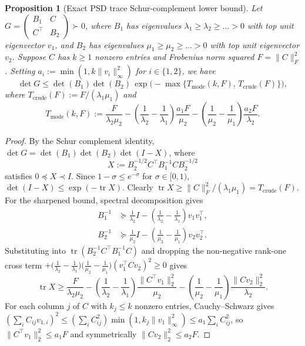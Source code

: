 \documentclass[11pt]{article}
\newtheorem{proposition}{Proposition}
\theoremstyle{remark}
\newcommand{\tr}{\operatorname{tr}}
\begin{document}
\begin{proposition}[Exact PSD trace Schur-complement lower bound]\label{prop:psd_trace}
Let $G = \begin{pmatrix} B_1 & C \\ C^\top & B_2 \end{pmatrix} \succ 0$, where $B_1$ has eigenvalues $\lambda_1 \ge \lambda_2 \ge \dots > 0$ with top unit eigenvector $v_1$, and $B_2$ has eigenvalues $\mu_1 \ge \mu_2 \ge \dots > 0$ with top unit eigenvector $v_2$. Suppose $C$ has $k \ge 1$ nonzero entries and Frobenius norm squared $F = \|C\|_F^2$. Setting $a_i := \min(1, k \|v_i\|_\infty^2)$ for $i \in \{1, 2\}$, we have
\begin{equation}\label{eq:psd_trace}
  \det G \le \det(B_1)\det(B_2)\,\exp\bigl(-\max\{T_{\mathrm{mode}}(k, F),\, T_{\mathrm{crude}}(F)\}\bigr),
\end{equation}
where $T_{\mathrm{crude}}(F) := F / (\lambda_1 \mu_1)$ and
\[
  T_{\mathrm{mode}}(k, F) := \frac{F}{\lambda_2 \mu_2}
  - \left(\frac{1}{\lambda_2} - \frac{1}{\lambda_1}\right)\frac{a_1 F}{\mu_2}
  - \left(\frac{1}{\mu_2} - \frac{1}{\mu_1}\right)\frac{a_2 F}{\lambda_2}.
\]
\end{proposition}

\begin{proof}
By the Schur complement identity, $\det G = \det(B_1)\det(B_2)\det(I - X)$, where
\[
  X := B_2^{-1/2} C^\top B_1^{-1} C B_2^{-1/2}
\]
satisfies $0 \preceq X \prec I$. Since $1 - \sigma \le e^{-\sigma}$ for $\sigma \in [0, 1)$, $\det(I - X) \le \exp(-\tr X)$. Clearly $\tr X \ge \|C\|_F^2 / (\lambda_1 \mu_1) = T_{\mathrm{crude}}(F)$. For the sharpened bound, spectral decomposition gives
\begin{align*}
  B_1^{-1} &\succeq \frac{1}{\lambda_2} I - \left(\frac{1}{\lambda_2} - \frac{1}{\lambda_1}\right) v_1 v_1^\top, \\
  B_2^{-1} &\succeq \frac{1}{\mu_2} I - \left(\frac{1}{\mu_2} - \frac{1}{\mu_1}\right) v_2 v_2^\top.
\end{align*}
Substituting into $\tr(B_2^{-1} C^\top B_1^{-1} C)$ and dropping the non-negative rank-one cross term $+\bigl(\frac{1}{\lambda_2} - \frac{1}{\lambda_1}\bigr)\bigl(\frac{1}{\mu_2} - \frac{1}{\mu_1}\bigr)(v_1^\top C v_2)^2 \ge 0$ gives
\[
  \tr X \ge \frac{F}{\lambda_2 \mu_2}
  - \left(\frac{1}{\lambda_2} - \frac{1}{\lambda_1}\right)\frac{\|C^\top v_1\|_2^2}{\mu_2}
  - \left(\frac{1}{\mu_2} - \frac{1}{\mu_1}\right)\frac{\|C v_2\|_2^2}{\lambda_2}.
\]
For each column $j$ of $C$ with $k_j \le k$ nonzero entries, Cauchy--Schwarz gives $(\sum_i C_{ij} v_{1,i})^2 \le (\sum_i C_{ij}^2)\min(1, k_j \|v_1\|_\infty^2) \le a_1 \sum_i C_{ij}^2$, so $\|C^\top v_1\|_2^2 \le a_1 F$ and symmetrically $\|C v_2\|_2^2 \le a_2 F$.
\end{proof}
\end{document}
